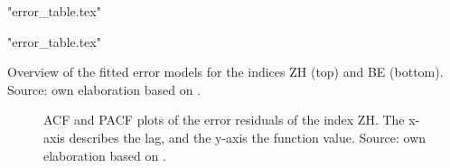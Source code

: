 \documentclass[11pt]{article}
\begin{document}
\begin{table}[p]
	\centering
	\begin{minipage}{1\linewidth}
		\centering
		{"error_table.tex"}
		\vspace*{0.7 cm}
	\end{minipage}
	\begin{minipage}{1\linewidth}
		\centering
		{"error_table.tex"}
		\vspace*{0.7 cm}
	\end{minipage}
	\caption{Overview of the fitted error models for the indices ZH (top) and BE (bottom). Source: own elaboration based on \cite{googleT}.}
	\label{tab:error}
\end{table}
\begin{figure}[p!]
	\begin{minipage}{.5\linewidth}
		\centering
	\end{minipage}	\begin{minipage}{.5\linewidth}
		\centering
	\end{minipage}
	\caption{ACF and PACF plots of the error residuals of the index ZH. The x-axis describes the lag, and the y-axis the function value. Source: own elaboration based on \cite{googleT}.}
	\label{fig:ACFPACFWN_ZH}
\end{figure}
\end{document}
